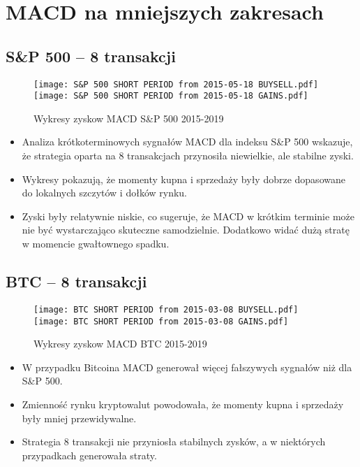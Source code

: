 \documentclass[12pt, letterpaper]{article}
\begin{document}
\section{MACD na mniejszych zakresach}
\subsection{S\&P 500 – 8 transakcji}
\begin{figure}[h!]
    \centering
    \texttt{[image: S\&P 500 SHORT PERIOD from 2015-05-18 BUYSELL.pdf]}
    \texttt{[image: S\&P 500 SHORT PERIOD from 2015-05-18 GAINS.pdf]}
    \caption{Wykresy zyskow MACD S\&P 500 2015-2019}
    \label{fig:BTC_2014_2017}
\end{figure}

\begin{itemize}
    \item Analiza krótkoterminowych sygnałów MACD dla indeksu S\&P 500 wskazuje, że strategia oparta na 8 transakcjach przynosiła niewielkie, ale stabilne zyski.
    \item Wykresy pokazują, że momenty kupna i sprzedaży były dobrze dopasowane do lokalnych szczytów i dołków rynku.
    \item Zyski były relatywnie niskie, co sugeruje, że MACD w krótkim terminie może nie być wystarczająco skuteczne samodzielnie. Dodatkowo widać dużą stratę w momencie gwałtownego spadku.
\end{itemize}
    

\subsection{BTC – 8 transakcji}

\begin{figure}[h!]
    \centering
    \texttt{[image: BTC SHORT PERIOD from 2015-03-08 BUYSELL.pdf]}
    \texttt{[image: BTC SHORT PERIOD from 2015-03-08 GAINS.pdf]}
    \caption{Wykresy zyskow MACD  BTC 2015-2019}
    \label{fig:BTC_2014_2017}
\end{figure}

\begin{itemize}
    \item W przypadku Bitcoina MACD generował więcej fałszywych sygnałów niż dla S\&P 500.
    \item Zmienność rynku kryptowalut powodowała, że momenty kupna i sprzedaży były mniej przewidywalne.
    \item Strategia 8 transakcji nie przyniosła stabilnych zysków, a w niektórych przypadkach generowała straty.
\end{itemize}
\end{document}
